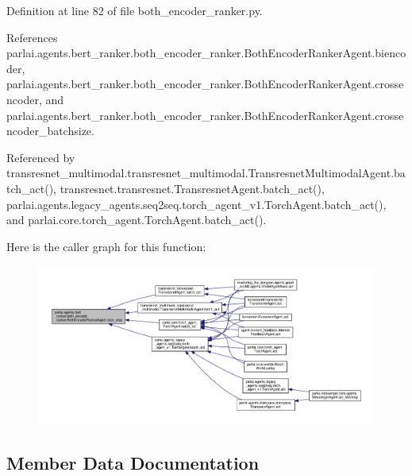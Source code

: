 Definition at line 82 of file both\+\_\+encoder\+\_\+ranker.\+py.



References parlai.\+agents.\+bert\+\_\+ranker.\+both\+\_\+encoder\+\_\+ranker.\+Both\+Encoder\+Ranker\+Agent.\+biencoder, parlai.\+agents.\+bert\+\_\+ranker.\+both\+\_\+encoder\+\_\+ranker.\+Both\+Encoder\+Ranker\+Agent.\+crossencoder, and parlai.\+agents.\+bert\+\_\+ranker.\+both\+\_\+encoder\+\_\+ranker.\+Both\+Encoder\+Ranker\+Agent.\+crossencoder\+\_\+batchsize.



Referenced by transresnet\+\_\+multimodal.\+transresnet\+\_\+multimodal.\+Transresnet\+Multimodal\+Agent.\+batch\+\_\+act(), transresnet.\+transresnet.\+Transresnet\+Agent.\+batch\+\_\+act(), parlai.\+agents.\+legacy\+\_\+agents.\+seq2seq.\+torch\+\_\+agent\+\_\+v1.\+Torch\+Agent.\+batch\+\_\+act(), and parlai.\+core.\+torch\+\_\+agent.\+Torch\+Agent.\+batch\+\_\+act().

Here is the caller graph for this function\+:
\nopagebreak
\begin{figure}[H]
\begin{center}
\leavevmode
\includegraphics[width=350pt]{classparlai_1_1agents_1_1bert__ranker_1_1both__encoder__ranker_1_1BothEncoderRankerAgent_a49ef7547db36c1570b8c10d0c8bee42e_icgraph}
\end{center}
\end{figure}


\subsection{Member Data Documentation}
\mbox{\label{classparlai_1_1agents_1_1bert__ranker_1_1both__encoder__ranker_1_1BothEncoderRankerAgent_a314d86777e26f7f1ab9a7b96bbaf1398}} 
